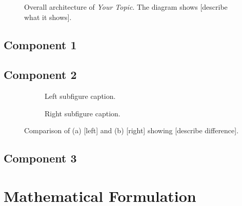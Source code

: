 \documentclass[12pt, a4paper]{article}
\begin{document}
\lipsum[6]

\begin{figure}[H]
    \centering
    \fbox{\rule{0pt}{5cm}\rule{0.8\textwidth}{0pt}}  %
    \caption{Overall architecture of \textit{Your Topic}. The diagram shows [describe what it shows].}
    \label{fig:architecture}
\end{figure}

\subsection{Component 1}
\lipsum[7]

\subsection{Component 2}
\lipsum[8]

\begin{figure}[H]
    \centering
    \begin{subfigure}[b]{0.45\textwidth}
        \centering
        \fbox{\rule{0pt}{3cm}\rule{\textwidth}{0pt}}
        \caption{Left subfigure caption.}
        \label{fig:a}
    \end{subfigure}
    \hfill
    \begin{subfigure}[b]{0.45\textwidth}
        \centering
        \fbox{\rule{0pt}{3cm}\rule{\textwidth}{0pt}}
        \caption{Right subfigure caption.}
        \label{fig:b}
    \end{subfigure}
    \caption{Comparison of (a) [left] and (b) [right] showing [describe difference].}
    \label{fig:comparison}
\end{figure}

\subsection{Component 3}
\lipsum[9]

\section{Mathematical Formulation}
\end{document}
